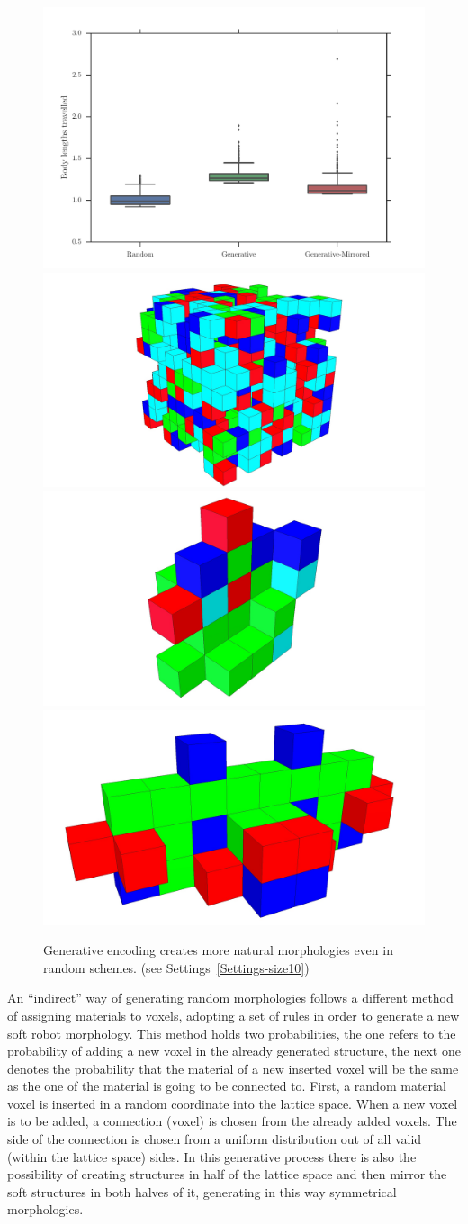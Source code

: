 \begin{figure}
\centering
\includegraphics[width=1.0\textwidth]{../Figures/Results/random.pdf}\\
\hspace{0.1cm}
\includegraphics[height=0.15\textwidth]{../Figures/Robots/random.jpg}
\includegraphics[height=0.15\textwidth]{../Figures/Robots/rg0.jpg}
\includegraphics[height=0.15\textwidth]{../Figures/Robots/rg1.jpg}
\caption{Generative encoding creates more natural morphologies even in random schemes. (see Settings~\ref{Settings-size10})}
\label{fig:randomResultsRobots}
\end{figure}

An ``indirect'' way of generating random morphologies follows a different method of assigning materials to voxels, adopting a set of rules in order to generate a new soft robot morphology. This method holds two probabilities, the one refers to the probability of adding a new voxel in the already generated structure, the next one denotes the probability that the material of a new inserted voxel will be the same as the one of the material is going to be connected to. First, a random material voxel is inserted in a random coordinate into the lattice space. When a new voxel is to be added, a connection (voxel) is chosen from the already added voxels. The side of the connection is chosen from a uniform distribution out of all valid (within the lattice space) sides. In this generative process there is also the possibility of creating structures in half of the lattice space and then mirror the soft structures in both halves of it, generating in this way symmetrical morphologies.

